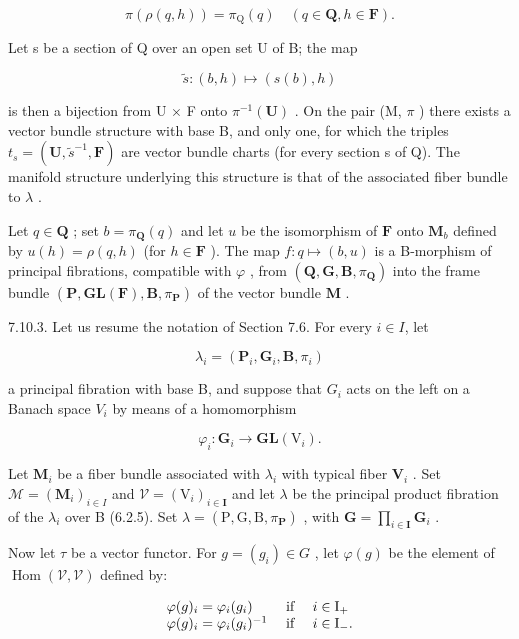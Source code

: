 \[
\pi (\rho (q, h)) = \pi_ {\mathrm{Q}} (q) \quad (q \in \mathbf{Q}, h \in \mathbf{F}).
\]

Let s be a section of Q over an open set U of B; the map

\[
\tilde {s}: (b, h) \mapsto (s (b), h)
\]

is then a bijection from U \(\times\) F onto \(\pi^{-1}(\mathbf{U})\) . On the pair (M, \(\pi\) ) there exists a vector bundle structure with base B, and only one, for which the triples \(t_{s} = (\mathbf{U}, \tilde{s}^{-1}, \mathbf{F})\) are vector bundle charts (for every section s of Q). The manifold structure underlying this structure is that of the associated fiber bundle to \(\lambda\) .

Let \(q \in \mathbf{Q}\) ; set \(b = \pi_{\mathbf{Q}}(q)\) and let \(u\) be the isomorphism of \(\mathbf{F}\) onto \(\mathbf{M}_b\) defined by \(u(h) = \rho(q, h)\) (for \(h \in \mathbf{F}\) ). The map \(f: q \mapsto (b, u)\) is a B-morphism of principal fibrations, compatible with \(\varphi\) , from \((\mathbf{Q}, \mathbf{G}, \mathbf{B}, \pi_{\mathbf{Q}})\) into the frame bundle \((\mathbf{P}, \mathbf{GL}(\mathbf{F}), \mathbf{B}, \pi_{\mathbf{P}})\) of the vector bundle \(\mathbf{M}\) .

7.10.3. Let us resume the notation of Section 7.6. For every \(i \in I\), let

\[
\lambda_ {i} = (\mathbf {P} _ {i}, \mathbf {G} _ {i}, \mathbf {B}, \pi_ {i})
\]

a principal fibration with base B, and suppose that \(G_{i}\) acts on the left on a Banach space \(V_{i}\) by means of a homomorphism

\[
\varphi_{i}: \mathbf{G}_{i} \rightarrow \mathbf{GL}(\mathrm{V}_{i}).
\]

Let \(\mathbf{M}_i\) be a fiber bundle associated with \(\lambda_i\) with typical fiber \(\mathbf{V}_i\) . Set \(\mathcal{M} = (\mathbf{M}_i)_{i\in I}\) and \(\mathcal{V} = (\mathrm{V}_i)_{i\in \mathbf{I}}\) and let \(\lambda\) be the principal product fibration of the \(\lambda_{i}\) over B (6.2.5). Set \(\lambda = (\mathrm{P},\mathrm{G},\mathrm{B},\pi_{\mathbf{P}})\) , with \(\mathbf{G} = \prod_{i\in \mathbf{I}}\mathbf{G}_i\) .

Now let \(\tau\) be a vector functor. For \(g = (g_i) \in G\) , let \(\varphi(g)\) be the element of \(\operatorname{Hom}(\mathcal{V}, \mathcal{V})\) defined by:

\[
\begin{array}{l l} \varphi (g) _ {i} = \varphi_ {i} (g _ {i}) & \text { if } \quad i \in \mathrm{I} _ {+} \\ \varphi (g) _ {i} = \varphi_ {i} (g _ {i}) ^ {- 1} & \text { if } \quad i \in \mathrm{I} _ {-}. \end{array}
\]


